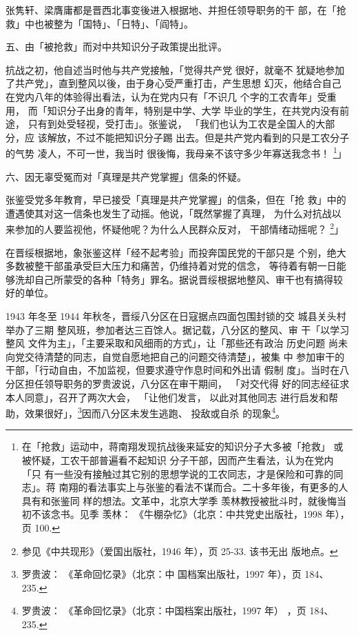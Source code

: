 张隽轩、梁膺庸都是晋西北事变後进入根据地、并担任领导职务的干
部，在「抢救」中也被整为「国特」、「日特」、「阎特」。

五、由「被抢救」而对中共知识分子政策提出批评。

抗战之初，他自述当时他与共产党接触，「觉得共产党
很好，就毫不 犹疑地参加
了共产党」，直到整风以後，由于身心受严重打击，产生思想 幻灭，他结合自己
在党内八年的体验得出看法，认为在党内只有「不识几 个字的工农青年」受重用，
而「知识分子出身的青年，特别是中学、大学 毕业的学生，在共党内没有前途，
只有到处受轻视，受打击」。张鉴说， 「我们也认为工农是全国人的大部分，应
该解放，不过不能把知识分子踢 出去。但是共产党内看到的只是工农分子的气势
凌人，不可一世，我当时 很後悔，我母亲不该守多少年寡送我念书！
\footnote{在「抢救」运动中，蒋南翔发现抗战後来延安的知识分子大多被「抢救」
或被怀疑，工农干部普遍看不起知识 分子干部，因而产生看法，认为在党内「只
有一些没有接触过其它别的思想学说的工农同志，才是保险和可靠的同志」。蒋
南翔的看法事实上与张鉴的看法不谋而合。二十多年後，有更多的人具有和张鉴同
样的想法。文革中，北京大学季 羡林教授被批斗时，就後悔当初不该念书。见季
羡林： 《牛棚杂忆》（北京：中共党史出版社，1998 年），页 100.}」

六、因无辜受冤而对「真理是共产党掌握」信条的怀疑。

张鉴受党多年教育，早已接受「真理是共产党掌握」的信条，但在「抢 救」中的
遭遇使其对这一信条也发生了动摇。他说，「既然掌握了真理， 为什么对抗战以
来参加的人要监视他，怀疑他呢？为什么人民群众反对， 干部情绪动摇呢？
\footnote{参见《中共现形》（爱国出版社，1946 年），页 25-33. 该书无出
版地点。}」

在晋绥根据地，象张鉴这样「经不起考验」而投奔国民党的干部只是 个别，绝大
多数被整干部虽承受巨大压力和痛苦，仍维持着对党的信念， 等待着有朝一日能
够洗却自己所蒙受的各种「特务」罪名。据说晋绥根据地整风、审干也有搞得较
好的单位。

1943 年冬至 1944 年秋冬，晋绥八分区在日寇据点四面包围封锁的交
城县关头村举办了三期 整风班，参加者达三百馀人。据记载，八分区的整风、审
干「以学习整风 文件为主」，「主要采取和风细雨的方式」，让「那些还有政治
历史问题 尚未向党交待清楚的同志，自觉自愿地把自己的问题交待清楚」，被集
中 参加审干的干部，「行动自由，不加监视，但要求遵守作息时间和外出请 假制
度」。当时在八分区担任领导职务的罗贵波说，八分区在审干期间， 「对交代得
好的同志经征求本人同意」，召开了两次大会， 「让他们发言， 以此对其他同志
进行启发和帮助，效果很好」，\footnote{罗贵波： 《革命回忆录》（北京：中
国档案出版社，1997 年），页 184、235.}因而八分区未发生逃跑、 投敌或自杀
的现象\footnote{罗贵波： 《革命回忆录》（北京：中国档案出版社，1997 年）
，页 184、235.}。
 
